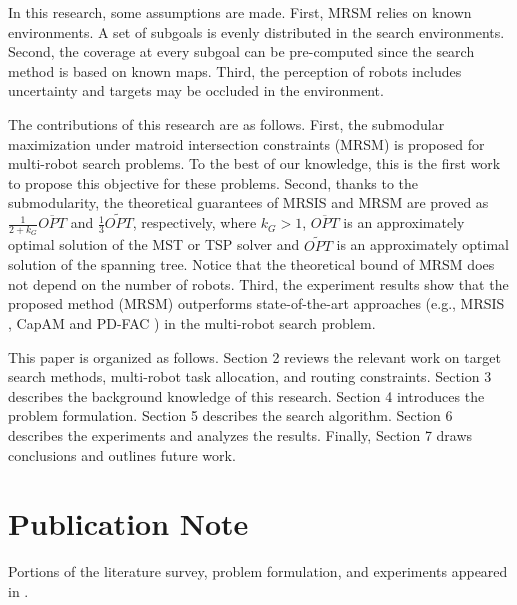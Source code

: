 In this research, some assumptions are made. First, MRSM relies on known environments. A set of subgoals is evenly distributed in the search environments.
Second, the coverage at every subgoal can be pre-computed since the search method is based on known maps.
Third, the perception of robots includes uncertainty and targets may be occluded in the environment.

The contributions of this research are as follows.
First,  the submodular maximization under matroid intersection constraints (MRSM) is proposed for multi-robot search problems.
To the best of our knowledge, this is the first work to propose this objective for these problems.
Second, thanks to the submodularity,
the theoretical guarantees of MRSIS \cite{li2024mrsis} and MRSM are proved as $\frac{1}{2+k_G} \overline{OPT}$ and $\frac{1}{3}\widetilde{OPT}$, respectively, where $k_G > 1$, $\overline{OPT}$ is an approximately optimal solution of the MST or TSP solver and $\widetilde{OPT}$ is an approximately optimal solution of the spanning tree.
Notice that the theoretical bound of MRSM does not depend on the number of robots.
Third, the experiment results show that the proposed method (MRSM) outperforms state-of-the-art approaches (e.g., MRSIS \cite{li2024mrsis}, CapAM \cite{paull2022learning} and PD-FAC \cite{sheng2022pd}) in the multi-robot search problem.

This paper is organized as follows. Section 2 reviews the relevant work on target search methods, multi-robot task allocation, and routing constraints. Section 3 describes the background knowledge of this research. Section 4 introduces the problem formulation. Section 5 describes the search algorithm. Section 6 describes the experiments and analyzes the results. Finally, Section 7 draws conclusions and outlines future work.

\section{Publication Note}
Portions of the literature survey, problem formulation, and experiments appeared in \cite{li2024mrsis}.


